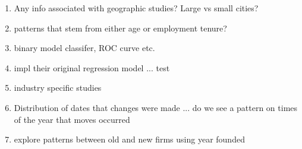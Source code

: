 \documentclass[10pt]{article}
\begin{document}
\begin{enumerate}
    \item Any info associated with geographic studies?  Large vs small cities? 
    \item  patterns that stem from either age or employment tenure? 
    \item binary model classifer, ROC curve etc. 
    \item impl their original regression model ... test 
    \item  industry specific studies 
    \item Distribution of dates that changes were made ... do we see a pattern on times of the 
          year that moves occurred 
    \item explore patterns between old and new firms using year founded 
\end{enumerate}
\end{document}
